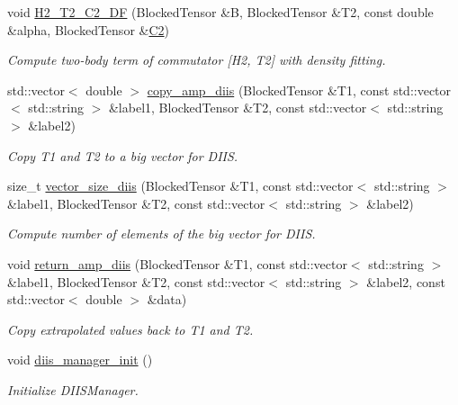 \begin{DoxyCompactItemize}
void \mbox{\hyperlink{classforte_1_1_m_r_d_s_r_g_ad7bcc90a9b428c2f653238d5b297572b}{H2\+\_\+\+T2\+\_\+\+C2\+\_\+\+DF}} (Blocked\+Tensor \&B, Blocked\+Tensor \&T2, const double \&alpha, Blocked\+Tensor \&\mbox{\hyperlink{namespaceforte_abe00ec86d0015c0f2b6ac298c6e428e4af1a543f5a2c5d49bc5dde298fcf716e4}{C2}})
\begin{DoxyCompactList}\small\item\em Compute two-\/body term of commutator \mbox{[}H2, T2\mbox{]} with density fitting. \end{DoxyCompactList}\item 
std\+::vector$<$ double $>$ \mbox{\hyperlink{classforte_1_1_m_r_d_s_r_g_a4aa8d2d07a9f7ef9baaefb680222b856}{copy\+\_\+amp\+\_\+diis}} (Blocked\+Tensor \&T1, const std\+::vector$<$ std\+::string $>$ \&label1, Blocked\+Tensor \&T2, const std\+::vector$<$ std\+::string $>$ \&label2)
\begin{DoxyCompactList}\small\item\em Copy T1 and T2 to a big vector for D\+I\+IS. \end{DoxyCompactList}\item 
size\+\_\+t \mbox{\hyperlink{classforte_1_1_m_r_d_s_r_g_a06178af5800f74eb6bca47abd7757011}{vector\+\_\+size\+\_\+diis}} (Blocked\+Tensor \&T1, const std\+::vector$<$ std\+::string $>$ \&label1, Blocked\+Tensor \&T2, const std\+::vector$<$ std\+::string $>$ \&label2)
\begin{DoxyCompactList}\small\item\em Compute number of elements of the big vector for D\+I\+IS. \end{DoxyCompactList}\item 
void \mbox{\hyperlink{classforte_1_1_m_r_d_s_r_g_a6130e600042b6dfdc2aee4e37b39b736}{return\+\_\+amp\+\_\+diis}} (Blocked\+Tensor \&T1, const std\+::vector$<$ std\+::string $>$ \&label1, Blocked\+Tensor \&T2, const std\+::vector$<$ std\+::string $>$ \&label2, const std\+::vector$<$ double $>$ \&data)
\begin{DoxyCompactList}\small\item\em Copy extrapolated values back to T1 and T2. \end{DoxyCompactList}\item 
void \mbox{\hyperlink{classforte_1_1_m_r_d_s_r_g_a199a3f0a81531ef17fc15b4272db7e51}{diis\+\_\+manager\+\_\+init}} ()
\begin{DoxyCompactList}\small\item\em Initialize D\+I\+I\+S\+Manager. \end{DoxyCompactList}\item 

\end{DoxyCompactItemize}
